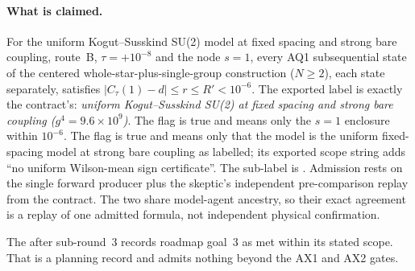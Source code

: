 \paragraph{What is claimed.}
For the uniform Kogut--Susskind SU(2) model at fixed spacing and strong bare
coupling, route~B, $\tau=+10^{-8}$ and the node $s=1$, every AQ1
subsequential state of the centered whole-star-plus-single-group construction
($N\ge2$), each state separately, satisfies $|C_\tau(1)-d|\le r\le R'<10^{-6}$.
The exported label is exactly the contract's: \emph{uniform Kogut--Susskind
SU(2) at fixed spacing and strong bare coupling ($g^4=9.6\times10^9$)}. The
flag  is true and means only the $s=1$
enclosure within $10^{-6}$. The flag  is true and
means only that the model is the uniform fixed-spacing model at strong bare
coupling as labelled; its exported scope string adds ``no uniform Wilson-mean
sign certificate''. The sub-label is . Admission
rests on the single forward producer plus the skeptic's independent
pre-comparison replay from the contract. The two share model-agent ancestry,
so their exact agreement is a replay of one admitted formula, not independent
physical confirmation.

The  after
sub-round~3 records roadmap goal~3 as met within its stated scope. That is a
planning record and admits nothing beyond the AX1 and AX2 gates.

